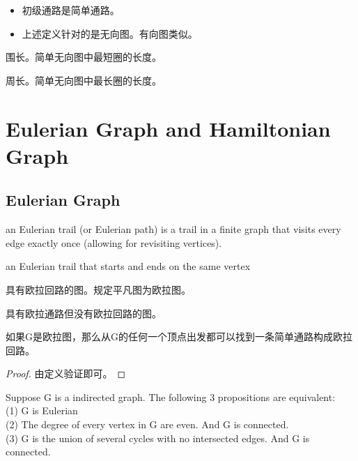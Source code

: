 \documentclass[11pt,fleqn]{book} %
\begin{document}
\begin{CJK}{UTF8}{gkai}
\begin{remark}
    \begin{itemize}
        \item 初级通路是简单通路。
        \item 上述定义针对的是无向图。有向图类似。
    \end{itemize}
    
\end{remark}
\begin{definition}
    [Girth] 围长。简单无向图中最短圈的长度。
\end{definition}
\begin{definition}
    [Perimeter] 周长。简单无向图中最长圈的长度。
\end{definition}

\chapter{Eulerian Graph and Hamiltonian Graph}
\section{Eulerian Graph}
\begin{definition}
     an Eulerian trail (or Eulerian path) is a trail in a finite graph that visits every edge exactly once (allowing for revisiting vertices).
\end{definition}
\begin{definition}
     an Eulerian trail that starts and ends on the same vertex
\end{definition}

\begin{definition}
     具有欧拉回路的图。规定平凡图为欧拉图。
\end{definition}
\begin{definition}
    [半欧拉图] 具有欧拉通路但没有欧拉回路的图。
\end{definition}

\begin{lemma}
    如果G是欧拉图，那么从G的任何一个顶点出发都可以找到一条简单通路构成欧拉回路。
\end{lemma}
\begin{proof}
    由定义验证即可。
\end{proof}

\begin{theorem}
    Suppose G is a indirected graph. The following 3 propositions are equivalent: \\
    (1) G is Eulerian \\
    (2) The degree of every vertex in G are even. And G is connected.\\ 
    (3) G is the union of several cycles with no intersected edges. And G is connected.


\end{theorem}
\end{CJK}
\end{document}
